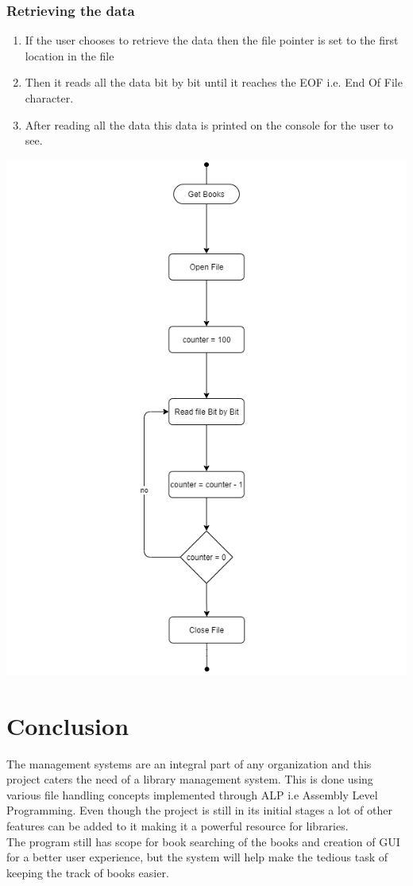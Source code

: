 \documentclass[conference]{IEEEtran}
\newenvironment{Figure}
  {\par\medskip\noindent\minipage{\linewidth}}
  {\endminipage\par\medskip}
\begin{document}
\subsubsection{Retrieving the data}
\begin{enumerate}
    \item If the user chooses to retrieve the data then the file pointer is set to the first location in the file
    \item Then it reads all the data bit by bit until it reaches the EOF i.e. End Of File character.
    \item After reading all the data this data is printed on the console for the user to see.
\end{enumerate}
\begin{Figure}
    \centering
    \includegraphics[width=\linewidth]{../resources/flowchart/getbooks.png}
    \figurename{}
\end{Figure}
\section{Conclusion}
The management systems are an integral part of any organization and this
project caters the need of a library management system. This is done using
various file handling concepts implemented through ALP i.e Assembly Level
Programming. Even though the project is still in its initial stages a lot
of other features can be added to it making it a powerful resource for
libraries.\\

The program still has scope for book searching of the books and creation
of GUI for a better user experience, but the system will help make the
tedious task of keeping the track of books easier.



\end{document}
